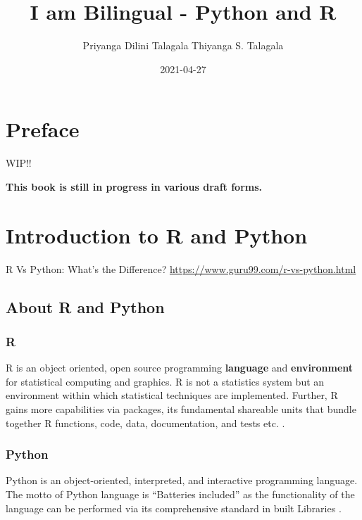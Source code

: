 \documentclass[]{book}
\title{I am Bilingual - Python and R}
\author{Priyanga Dilini Talagala Thiyanga S. Talagala}
\date{2021-04-27}
\begin{document}
\maketitle

{
\setcounter{tocdepth}{1}
\tableofcontents
}
\hypertarget{preface}{%
\chapter*{Preface}\label{preface}}

WIP!!

\textbf{This book is still in progress in various draft forms.}

\hypertarget{intro}{%
\chapter{Introduction to R and Python}\label{intro}}

R Vs Python: What's the Difference? \url{https://www.guru99.com/r-vs-python.html}

\hypertarget{about-r-and-python}{%
\section{About R and Python}\label{about-r-and-python}}

\hypertarget{r}{%
\subsection{R}\label{r}}

R is an object oriented, open source programming \textbf{language} and \textbf{environment} for statistical computing and graphics. R is not a statistics system but an environment within which statistical techniques are implemented. Further, R gains more capabilities via packages, its fundamental shareable units that bundle together R functions, code, data, documentation, and tests etc. \citep{Rcoreteam2020}.

\hypertarget{python}{%
\subsection{Python}\label{python}}

Python is an object-oriented, interpreted, and interactive programming language. The motto of Python language is ``Batteries included'' as the functionality of the language can be performed via its comprehensive standard in built Libraries \citep{wikipython}.
\end{document}
